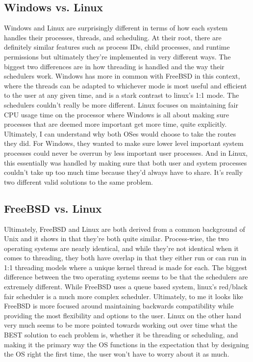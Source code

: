 \subsection{Windows vs. Linux}
Windows and Linux are surprisingly different in terms of how each system handles their processes, threads, and scheduling. At their root, there are definitely similar features such as process IDs, child processes, and runtime permissions but ultimately they're implemented in very different ways. The biggest two differences are in how threading is handled and the way their schedulers work. Windows has more in common with FreeBSD in this context, where the threads can be adapted to whichever mode is most useful and efficient to the user at any given time, and is a stark contrast to linux's 1:1 mode. The schedulers couldn't really be more different. Linux focuses on maintaining fair CPU usage time on the processor where Windows is all about making sure processes that are deemed more important get more time, quite explicitly. Ultimately, I can understand why both OSes would choose to take the routes they did. For Windows, they wanted to make sure lower level important system processes could never be overrun by less important user processes. And in Linux, this essentially was handled by making sure that both user and system processes couldn't take up too much time because they'd always have to share. It's really two different valid solutions to the same problem.

\subsection{FreeBSD vs. Linux}
Ultimately, FreeBSD and Linux are both derived from a common background of Unix and it shows in that they're both quite similar. Process-wise, the two operating systems are nearly identical, and while they're not identical when it comes to threading, they both have overlap in that they either run or can run in 1:1 threading models where a unique kernel thread is made for each. The biggest difference between the two operating systems seems to be that the schedulers are extremely different. While FreeBSD uses a queue based system, linux's red/black fair scheduler is a much more complex scheduler. Ultimately, to me it looks like FreeBSD is more focused around maintaining backwards compatibility while providing the most flexibility and options to the user. Linux on the other hand very much seems to be more pointed towards working out over time what the BEST solution to each problem is, whether it be threading or scheduling, and making it the primary way the OS functions in the expectation that by designing the OS right the first time, the user won't have to worry about it as much. 

